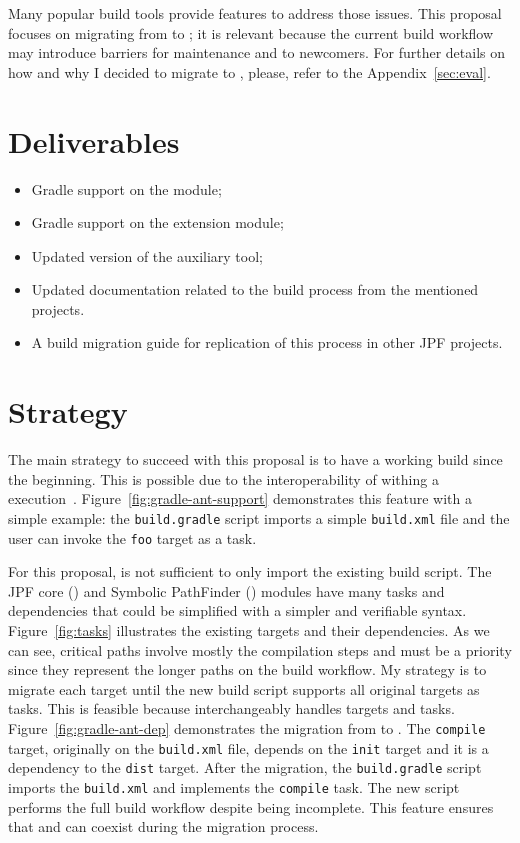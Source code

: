 \documentclass{article}
\begin{document}
Many popular build tools provide features to address those issues.
This proposal focuses on migrating from \ant{} to \gradle{}; it is relevant
because the current build workflow may introduce barriers for maintenance and
to newcomers.
For further details on how and why I decided to migrate to \gradle{}, please,
refer to the Appendix~\ref{sec:eval}.

\section{Deliverables}
\label{sec:deliv}

\begin{itemize}
\item Gradle support on the \jpfcore{} module;
\item Gradle support on the \jpfsymbc{} extension module;
\item Updated version of the \jpftemplate{} auxiliary tool;
\item Updated documentation related to the build process from the mentioned
      projects.
\item A build migration guide for replication of this process in other JPF
      projects.
\end{itemize}

\section{Strategy}
\label{sec:plan}

The main strategy to succeed with this proposal is to have a working \gradle{}
build since the beginning.
This is possible due to the interoperability of \ant{} withing a \gradle{}
execution~\cite{page:gradle-ant-support}.
Figure~\ref{fig:gradle-ant-support} demonstrates this feature with a simple
example: the \texttt{build.gradle} script imports a simple \texttt{build.xml}
file and the user can invoke the \texttt{foo} target as a \gradle{} task.

For this proposal, is not sufficient to only import the existing build script. 
The JPF core (\jpfcore) and Symbolic PathFinder (\jpfsymbc) modules have many
tasks and dependencies that could be simplified with a simpler and verifiable
syntax.
Figure~\ref{fig:tasks} illustrates the existing \ant{} targets and their
dependencies.
As we can see, critical paths involve mostly the compilation steps and must
be a priority since they represent the longer paths on the build workflow.
My strategy is to migrate each \ant{} target until the new build script
supports all original targets as \gradle{} tasks.
This is feasible because \gradle{} interchangeably handles \ant{} targets and
\gradle{} tasks.
Figure~\ref{fig:gradle-ant-dep} demonstrates the migration from \ant{} to
\gradle{}.
The \texttt{compile} target, originally on the \texttt{build.xml} file, depends
on the \texttt{init} target and it is a dependency to the \texttt{dist} target.
After the migration, the \texttt{build.gradle} script imports the
\texttt{build.xml} and implements the \texttt{compile} task.
The new \gradle{} script performs the full build workflow despite being
incomplete.
This feature ensures that \ant{} and \gradle{} can coexist during the migration
process.
\end{document}
